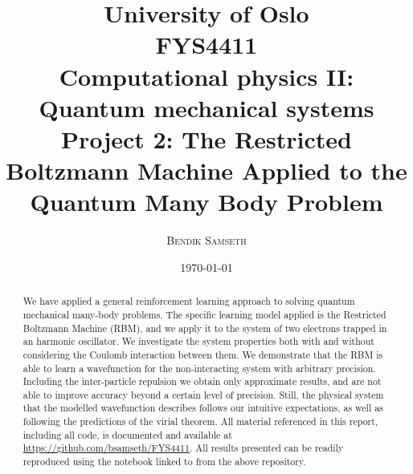 \documentclass[a4paper, 11pt]{article}
\title{ \small
University of Oslo\\
FYS4411\\
Computational physics II: Quantum mechanical systems\\
\huge Project 2: The Restricted Boltzmann Machine Applied to the Quantum Many Body Problem}
\author{\textsc{Bendik Samseth}}
\date{\today}
\begin{document}
\maketitle

\begin{abstract}
    We have applied a general reinforcement learning approach to solving quantum
    mechanical many-body problems. The specific learning model applied is the
    Restricted Boltzmann Machine (RBM), and we apply it to the system of two electrons trapped
    in an harmonic oscillator. We investigate the system properties both with
    and without considering the Coulomb interaction between them. We demonstrate
    that the RBM is able to learn a wavefunction for the non-interacting system
    with arbitrary precision. Including the inter-particle repulsion we obtain
    only approximate results, and are not able to improve accuracy beyond a
    certain level of precision. Still, the physical system that the modelled
    wavefunction describes follows our intuitive expectations, as well as
    following the predictions of the virial theorem.
    All material referenced in this report, including all code, is documented
    and available at \url{https://github.com/bsamseth/FYS4411}. All results
    presented can be readily reproduced using the notebook linked to from the
    above repository.
\end{abstract}


\pagebreak
{}
\tableofcontents
\end{document}
